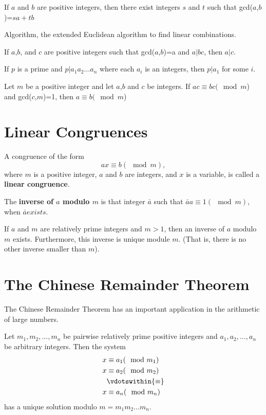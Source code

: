 \begin {theorem}
If $a$ and $b$ are positive integers, then there exist integers $s$ and $t$ such that gcd($a$,$b$)=$sa+tb$
\end {theorem}
Algorithm, the extended Euclidean algorithm to find linear combinations.

\begin{lemma}
If $a$,$b$, and $c$ are positive integers such that gcd($a$,$b$)=a and $a \vert bc$, then $a \vert c$.
\end{lemma}

\begin{lemma}
If $p$ is a prime and $p \vert a_1a_2\dots a_n$ where each $a_i$ is an integers, then $p\vert a_1$ for some $i$.
\end{lemma}

\begin{theorem}
Let $m$ be a positive integer and let $a$,$b$ and $c$ be integers. If $ac\equiv bc(\mod m$) and gcd($c$,$m$)=1, then $a\equiv b(\mod m$)
\end{theorem}

\section {Linear Congruences}
A congruence of the form
$$ax \equiv b (\mod m),$$
where $m$ is a positive integer, $a$ and $b$ are integers, and $x$ is a variable, is called a \textbf{linear congruence}. 

\begin{definition}
The \textbf{inverse of $a$ modulo $m$} is that integer $\bar{a}$ such that $\bar{a} a\equiv 1 (\mod m)$, when $\bar{a} exists$.
\end{definition}

\begin{theorem}
If $a$ and $m$ are relatively prime integers and $m>1$, then an inverse of $a$ modulo $m$ exists. Furthermore, this inverse is unique module $m$. (That is, there is no other inverse smaller than $m$).
\end{theorem}

\section {The Chinese Remainder Theorem}
The Chinese Remainder Theorem has an important application in the arithmetic of large numbers.

\begin{theorem}
Let $m_1,m_2, \dots ,m_n$ be pairwise relatively prime positive integers and $a_1,a_2, \dots ,a_n$ be arbitrary integers. Then the system
\begin{equation}
\begin{aligned}
x & \equiv a_1 (\mod m_1) \\
x & \equiv a_2 (\mod m_2) \\
   & \vdotswithin{\equiv}\\
x & \equiv a_n (\mod m_n)
\end{aligned}
\end{equation}
has a unique solution modulo $m=m_1m_2 \dots m_n$.
\end{theorem}


